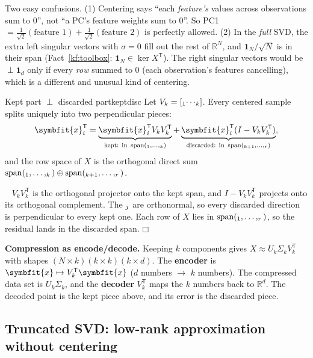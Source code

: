 \documentclass[11pt]{article}
\newcommand{\bm}[1]{\symbfit{#1}}
\newenvironment{proofsketch}{\par\noindent{\itshape Proof.}\ }{\hfill$\mdlgwhtsquare$\par}
\newcommand{\R}{\mathbb{R}}
\newcommand{\vx}{\bm{x}}
\let\vv\relax\newcommand{\vv}{\bm{v}}
\newcommand{\one}{\symbf{1}}
\newcommand{\T}{^{\mathsf T}}
\newcommand{\spn}{\operatorname{span}}
\begin{document}
\begin{careful}
Two easy confusions. (1) Centering says ``each \emph{feature's} values across observations sum to $0$'', not ``a PC's feature
weights sum to $0$''. So PC1 $=\tfrac1{\sqrt2}(\text{feature 1})+\tfrac1{\sqrt2}(\text{feature 2})$ is perfectly allowed. (2) In the \emph{full} SVD, the
extra left singular vectors with $\sigma=0$ fill out the rest of $\R^N$, and $\one_N/\sqrt N$ is in their span (Fact~\ref{kf:toolbox}: $\one_N\in\ker X\T$).
The right singular vectors would be $\perp\one_d$ only if every \emph{row} summed to $0$ (each observation's features
cancelling), which is a different and unusual kind of centering.
\end{careful}

\begin{proposition}{Kept part $\perp$ discarded part}{keptdisc}
Let $V_k=[\vv_1\cdots\vv_k]$. Every centered sample splits uniquely into two perpendicular pieces:
\[
\vx_i\T=\underbrace{\vx_i\T V_kV_k\T}_{\text{kept: in }\spn(\vv_1,\dots,\vv_k)}+\underbrace{\vx_i\T(I-V_kV_k\T)}_{\text{discarded: in }\spn(\vv_{k+1},\dots,\vv_r)} ,
\]
and the row space of $X$ is the orthogonal direct sum $\spn(\vv_1,\dots,\vv_k)\oplus\spn(\vv_{k+1},\dots,\vv_r)$.
\end{proposition}
\begin{proofsketch}
$V_kV_k\T$ is the orthogonal projector onto the kept span, and $I-V_kV_k\T$ projects onto its
orthogonal complement. The $\vv_j$ are orthonormal, so every discarded direction is perpendicular to
every kept one. Each row of $X$ lies in $\spn(\vv_1,\dots,\vv_r)$, so the residual lands in the discarded span.
\end{proofsketch}

\textbf{Compression as encode/decode.} Keeping $k$ components gives
$X\approx U_k\Sigma_kV_k\T$ with shapes $(N\times k)(k\times k)(k\times d)$. The \textbf{encoder} is
$\vx\mapsto V_k\T\vx$ ($d$ numbers $\to$ $k$ numbers). The compressed data set is $U_k\Sigma_k$, and the
\textbf{decoder} $V_k\T$ maps the $k$ numbers back to $\R^d$. The decoded point is the kept piece above,
and its error is the discarded piece.

\subsection{Truncated SVD: low-rank approximation without centering}
\end{document}
